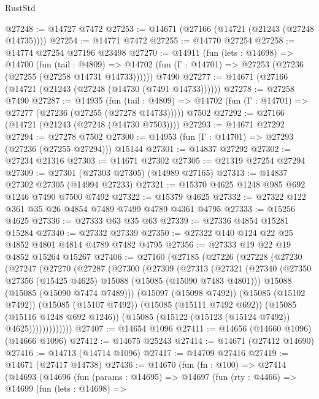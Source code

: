 \begin{lexlean}{RustStd}
\begin{coremodule}
@27248 := @14727 @7472
@27253 := @14671 (@27166 (@14721 (@21243 (@27248 @14735))))
@27254 := @14771 @7472
@27255 := @14770 @27254
@27258 := @14774 @27254 @27196 @23498
@27270 := @14911
    (fun (lets : @14698) =>
    @14700
      (fun (tail : @4809) =>
      @14702 (fun (Γ : @14701) => @27253 (@27236 (@27255 (@27258 @14731 @14733))))))
    @7490
@27277 := @14671 (@27166 (@14721 (@21243 (@27248 (@14730 (@7491 @14733))))))
@27278 := @27258 @7490
@27287 := @14935
    (fun (tail : @4809) => @14702 (fun (Γ : @14701) => @27277 (@27236 (@27255 (@27278 @14733)))))
    @7502
@27292 := @27166 (@14721 (@21243 (@27248 (@14730 @7503))))
@27293 := @14671 @27292
@27294 := @27278 @7502
@27300 := @14953 (fun (Γ : @14701) => @27293 (@27236 (@27255 @27294))) @15144
@27301 := @14837 @27292
@27302 := @27234 @21316
@27303 := @14671 @27302
@27305 := @21319 @27254 @27294
@27309 := @27301 (@27303 @27305) (@14989 @27165)
@27313 := @14837 @27302 @27305 (@14994 @27233)
@27321 := @15370 @4625 @1248 @985 @692 @1246 @7490 @7500 @7492
@27322 := @15379 @4625
@27332 := @27322 @122 @361 @35 @26 @4854 @7489 @7499 @4789 @4361 @4795
@27333 := @15256 @4625
@27336 := @27333 @63 @35 @63
@27339 := @27336 @4854 @15281 @15284
@27340 := @27332 @27339
@27350 := @27322 @140 @124 @22 @25 @4852 @4801 @4814 @4789 @7482 @4795
@27356 := @27333 @19 @22 @19 @4852 @15264 @15267
@27406 := @27160
    (@27185
      (@27226
        (@27228
          (@27230
            (@27247
              (@27270
                (@27287
                  (@27300
                    (@27309
                      (@27313
                        (@27321
                          (@27340
                            (@27350 @27356 (@15425 @4625) @15088 (@15085 (@15090 @7483 @4801)))
                            @15088
                            (@15085 (@15090 @7474 @7489)))
                          (@15097 (@15098 @7492))
                          (@15085 (@15102 @7492))
                          (@15085 (@15107 @7492))
                          (@15085 (@15111 @7492 @692))
                          (@15085 (@15116 @1248 @692 @1246))
                          (@15085 (@15122 (@15123 (@15124 @7492)) @4625)))))))))))))
@27407 := @14654 @1096
@27411 := @14656 (@14660 @1096) (@14666 @1096)
@27412 := @14675 @25243
@27414 := @14671 (@27412 @14690)
@27416 := @14713 (@14714 @1096)
@27417 := @14709 @27416
@27419 := @14671 (@27417 @14738)
@27436 := @14670
    (fun (fn : @100) =>
    @27414
      (@14693
        (@14696
          (fun (params : @14695) =>
          @14697
            (fun (rty : @4466) =>
            @14699
              (fun (lets : @14698) =>

\end{coremodule}
\end{lexlean}
